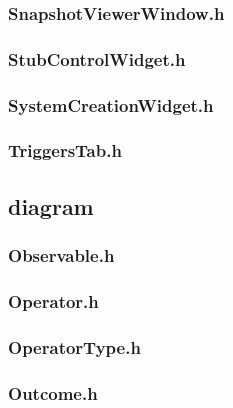 \subsubsection*{SnapshotViewerWindow.h}


\subsubsection*{StubControlWidget.h}


\subsubsection*{SystemCreationWidget.h}


\subsubsection*{TriggersTab.h}


\subsection*{diagram}

\subsubsection*{Observable.h}


\subsubsection*{Operator.h}


\subsubsection*{OperatorType.h}


\subsubsection*{Outcome.h}


